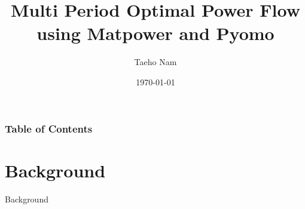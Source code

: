 \documentclass[
	11pt, %
	aspectratio=169, %
]{beamer}
\title[OPF using Matpower and Pyomo]{Multi Period Optimal Power Flow \\ using Matpower and Pyomo} %
\author[Taeho Nam]{Taeho Nam} %
\institute[CWNU]{Changwon National University \\ \smallskip \textit{rapitransit@gmail.com}} %
\date[\today]{\today} %
\begin{document}

\begin{frame}
	\titlepage %
\end{frame}



\begin{frame}[allowframebreaks]
	\frametitle{Table of Contents} %
	
	\tableofcontents %
\end{frame}


\section{Background}

\begin{frame}
    \centering
    \LARGE
    Background
\end{frame}
\end{document}
